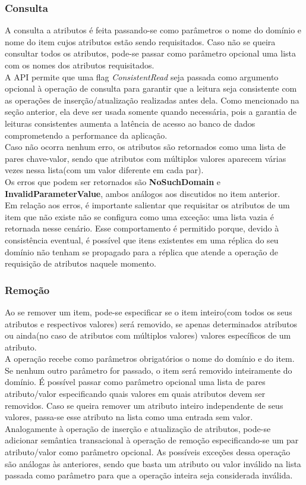 \subsubsection{Consulta}
A consulta a atributos é feita passando-se como parâmetros o nome do domínio e nome do item cujos atributos estão sendo requisitados. Caso não se queira consultar todos os atributos, pode-se passar como parâmetro opcional uma lista com os nomes dos atributos requisitados.\\
A API permite que uma flag \textit{ConsistentRead} seja passada como argumento opcional à operação de consulta para garantir que a leitura seja consistente com as operações de inserção/atualização realizadas antes dela. Como mencionado na seção anterior, ela deve ser usada somente quando necessária, pois a garantia de leituras consistentes aumenta a latência de acesso ao banco de dados comprometendo a performance da aplicação.\\
Caso não ocorra nenhum erro, os atributos são retornados como uma lista de pares chave-valor, sendo que atributos com múltiplos valores aparecem várias vezes nessa lista(com um valor diferente em cada par).\\
Os erros que podem ser retornados são \textbf{NoSuchDomain} e \textbf{InvalidParameterValue}, ambos análogos aos discutidos no item anterior.\\
Em relação aos erros, é importante salientar que requisitar os atributos de um item que não existe não se configura como uma exceção: uma lista vazia é retornada nesse cenário. Esse comportamento é permitido porque, devido à consistência eventual, é possível que itens existentes em uma réplica do seu domínio não tenham se propagado para a réplica que atende a operação de requisição de atributos naquele momento.

\subsubsection{Remoção}
Ao se remover um item, pode-se especificar se o item inteiro(com todos os seus atributos e respectivos valores) será removido, se apenas determinados atributos ou ainda(no caso de atributos com múltiplos valores) valores específicos de um atributo. \\
A operação recebe como parâmetros obrigatórios o nome do domínio e do item. Se nenhum outro parâmetro for passado, o item será removido inteiramente do domínio. É possível passar como parâmetro opcional uma lista de pares atributo/valor especificando quais valores em quais atributos devem ser removidos. Caso se queira remover um atributo inteiro independente de seus valores, passa-se esse atributo na lista como uma entrada sem valor.\\
Analogamente à operação de inserção e atualização de atributos, pode-se adicionar semântica transacional à operação de remoção especificando-se um par atributo/valor como parâmetro opcional.
As possíveis exceções dessa operação são análogas às anteriores, sendo que basta um atributo ou valor inválido na lista passada como parâmetro para que a operação inteira seja considerada inválida.

